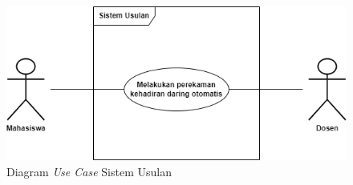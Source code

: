 \begin{figure}[H]
	\centering
	\includegraphics[scale=0.6]{Gambar/usecaseUsulan.png}
	\caption{Diagram \textit{Use Case} Sistem Usulan} 
	\label{fig:usecaseUsulan}
\end{figure}

